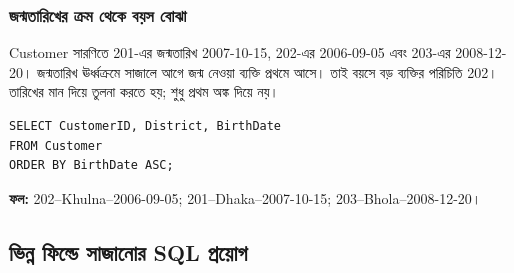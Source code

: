 \subsubsection{জন্মতারিখের ক্রম থেকে বয়স বোঝা}
Customer সারণিতে 201-এর জন্মতারিখ 2007-10-15, 202-এর 2006-09-05 এবং 203-এর 2008-12-20। জন্মতারিখ ঊর্ধ্বক্রমে সাজালে আগে জন্ম নেওয়া ব্যক্তি প্রথমে আসে। তাই বয়সে বড় ব্যক্তির পরিচিতি 202। তারিখের মান দিয়ে তুলনা করতে হয়; শুধু প্রথম অঙ্ক দিয়ে নয়।
\begin{verbatim}
SELECT CustomerID, District, BirthDate
FROM Customer
ORDER BY BirthDate ASC;
\end{verbatim}
\textbf{ফল:} 202--Khulna--2006-09-05; 201--Dhaka--2007-10-15; 203--Bhola--2008-12-20।

\subsection{ভিন্ন ফিল্ডে সাজানোর SQL প্রয়োগ}

